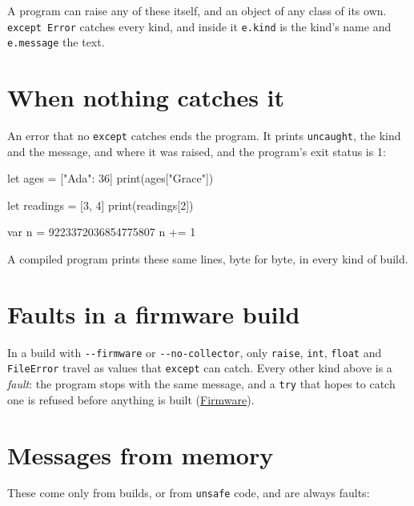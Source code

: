 A program can raise any of these itself, and an object of any class of
its own. \verb|except Error| catches every kind, and inside it
\verb|e.kind| is the kind's name and \verb|e.message| the text.

\section{When nothing catches it}

An error that no \verb|except| catches ends the program. It prints
\verb|uncaught|, the kind and the message, and where it was raised,
and the program's exit status is 1:

\begin{zeno}[fails=yes]
let ages = ["Ada": 36]
print(ages["Grace"])
\end{zeno}

\begin{zeno}[fails=yes]
let readings = [3, 4]
print(readings[2])
\end{zeno}

\begin{zeno}[fails=yes]
var n = 9223372036854775807
n += 1
\end{zeno}

A compiled program prints these same lines, byte for byte, in every
kind of build.

\section{Faults in a firmware build}

In a build with \verb|--firmware| or \verb|--no-collector|, only
\verb|raise|, \verb|int|, \verb|float| and \verb|FileError| travel as
values that \verb|except| can catch. Every other kind above is a
\emph{fault}: the program stops with the same message, and a
\verb|try| that hopes to catch one is refused before anything is built
(\hyperref[ch-firmware]{Firmware}).

\section{Messages from memory}

These come only from builds, or from \verb|unsafe| code, and are always
faults:

